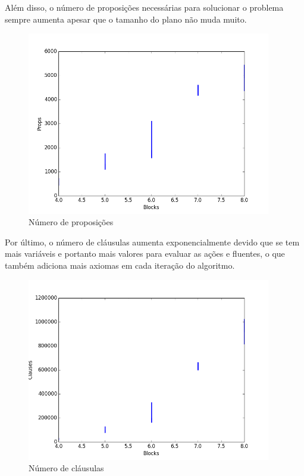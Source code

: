 	Além disso, o número de proposições necessárias para solucionar o problema sempre aumenta apesar que o tamanho do plano não muda muito.
		\begin{figure}[H]
			\centering
			\includegraphics[height=8cm]{images/blocks-props}
			\caption{Número de proposições}
			\label{fig:satprops}
		\end{figure}
	Por último, o número de cláusulas aumenta exponencialmente devido que se tem mais variáveis e portanto mais valores para evaluar as ações e fluentes, o que também adiciona mais axiomas em cada iteração do algoritmo. 
		\begin{figure}[H]
			\centering
			\includegraphics[height=8cm]{images/blocks-clauses}
			\caption{Número de cláusulas}
			\label{fig:satclauses}
		\end{figure}